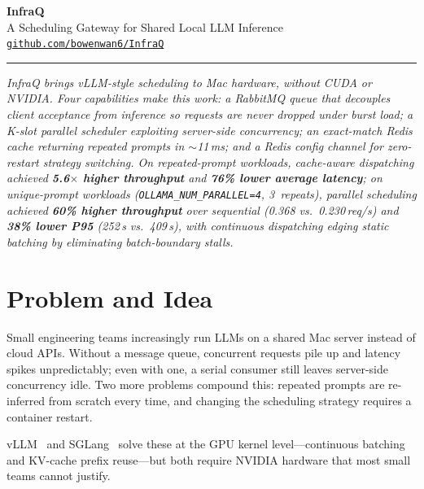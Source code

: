 \documentclass[10pt,a4paper]{article}
\begin{document}
\vspace*{-0.3em}
\begin{center}
  {\LARGE\bfseries\color{uoeblue}InfraQ}\\[5pt]
  {\large A Scheduling Gateway for Shared Local LLM Inference}\\[4pt]
  {\small\textcolor{uoeblue}{\faGithub}\enspace
   \href{https://github.com/bowenwan6/InfraQ}{\texttt{github.com/bowenwan6/InfraQ}}}
\end{center}
{\color{uoeblue}\rule{\linewidth}{1.0pt}}
\vspace{3pt}

\textit{InfraQ brings vLLM-style scheduling to Mac hardware, without CUDA or NVIDIA.
Four capabilities make this work: a RabbitMQ queue that decouples client acceptance from
inference so requests are never dropped under burst load;
a K-slot parallel scheduler exploiting server-side concurrency;
an exact-match Redis cache returning repeated prompts in $\sim$11\,ms;
and a Redis config channel for zero-restart strategy switching.
On repeated-prompt workloads, cache-aware dispatching achieved
\textbf{5.6$\times$ higher throughput} and \textbf{76\% lower average latency};
on unique-prompt workloads (\texttt{OLLAMA\_NUM\_PARALLEL=4}, 3~repeats),
parallel scheduling achieved \textbf{60\% higher throughput} over sequential
(0.368 vs.\ 0.230\,req/s) and \textbf{38\% lower P95} (252\,s vs.\ 409\,s),
with continuous dispatching edging static batching by eliminating batch-boundary stalls.}

\vspace{2pt}

\section{Problem and Idea}

Small engineering teams increasingly run LLMs on a shared Mac server instead of cloud APIs.
Without a message queue, concurrent requests pile up and latency spikes unpredictably;
even with one, a serial consumer still leaves server-side concurrency idle.
Two more problems compound this: repeated prompts are re-inferred from scratch every time,
and changing the scheduling strategy requires a container restart.

vLLM~\cite{vllm} and SGLang~\cite{sglang} solve these at the GPU kernel level---continuous
batching and KV-cache prefix reuse---but both require NVIDIA hardware that most small
teams cannot justify.
\end{document}
